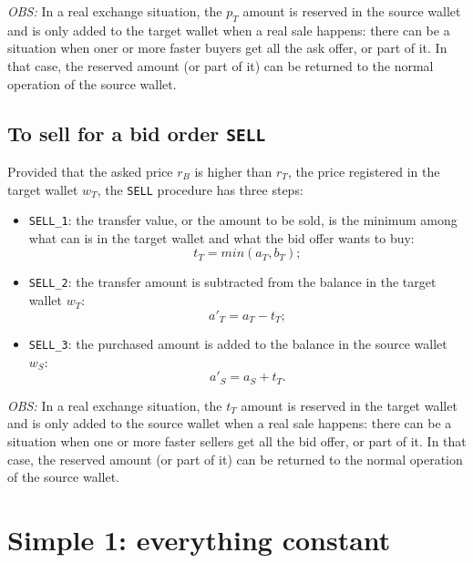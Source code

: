 \documentclass[a4paper,11pt]{article}
\begin{document}
{\em OBS:} In a real exchange situation, the $p_T$ amount is reserved in the source wallet and is 
only added to the target wallet when a real sale happens: there can be a situation when oner or 
more faster buyers get all the ask offer, or part of it. In that case, the reserved amount (or 
part of it) can be returned to the normal operation of the source wallet.

\subsection{To sell for a bid order {\tt SELL}}

Provided that the asked price $r_B$ is higher than $r_T$, the price registered in the 
target wallet $w_T$, the {\tt SELL} procedure has three steps:

\begin{itemize}
    \item \label{itm:SELL-1} {\tt SELL\_1}: 
	the transfer value, or the amount to be sold, is the minimum among what can is in 
	the target wallet and what the bid offer wants to buy:
	\begin{equation*}
	    t_T = min (a_T, b_T); 
	\end{equation*}
	
    \item \label{itm:SELL-2} {\tt SELL\_2}:
	the transfer amount is subtracted from the balance in the target wallet $w_T$:
	\begin{equation*}
	    a'_T = a_T - t_T;
	\end{equation*}
	
    \item \label{itm:SELL-3} {\tt SELL\_3}:
	the purchased amount is added to the balance in the source wallet $w_S$:
	\begin{equation*}
 	    a'_S = a_S + t_T.
	\end{equation*}
	
\end{itemize}
{\em OBS:} In a real exchange situation, the $t_T$ amount is reserved in the target wallet and is 
only added to the source wallet when a real sale happens: there can be a situation when one or 
more faster sellers get all the bid offer, or part of it. In that case, the reserved amount (or 
part of it) can be returned to the normal operation of the source wallet.

\section{Simple 1: everything constant}
\label{sec:Simple1}
\end{document}
